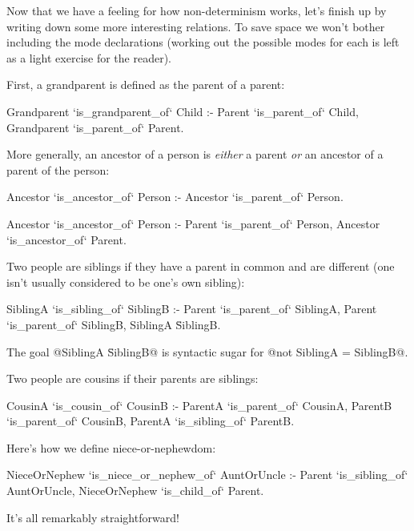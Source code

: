 Now that we have a feeling for how non-determinism works, let's finish up by
writing down some more interesting relations.  To save space we won't bother
including the mode declarations (working out the possible modes for each is
left as a light exercise for the reader).

First, a grandparent is defined as the parent of a parent:
\begin{myverbatim}
Grandparent `is_grandparent_of` Child :-
    Parent `is_parent_of` Child,
    Grandparent `is_parent_of` Parent.
\end{myverbatim}
More generally, an ancestor of a person is \emph{either} a parent 
\emph{or} an ancestor of a parent of the person:
\begin{myverbatim}
Ancestor `is_ancestor_of` Person :-
    Ancestor `is_parent_of` Person.

Ancestor `is_ancestor_of` Person :-
    Parent `is_parent_of` Person,
    Ancestor `is_ancestor_of` Parent.
\end{myverbatim}
Two people are siblings if they have a parent in common and are different
(one isn't usually considered to be one's own sibling):
\begin{myverbatim}
SiblingA `is_sibling_of` SiblingB :-
    Parent `is_parent_of` SiblingA,
    Parent `is_parent_of` SiblingB,
    SiblingA \= SiblingB.
\end{myverbatim}
The goal @SiblingA \= SiblingB@ is syntactic sugar for
@not SiblingA = SiblingB@.

Two people are cousins if their parents are siblings:
\begin{myverbatim}
CousinA `is_cousin_of` CousinB :-
    ParentA `is_parent_of` CousinA,
    ParentB `is_parent_of` CousinB,
    ParentA `is_sibling_of` ParentB.
\end{myverbatim}
Here's how we define niece-or-nephewdom:
\begin{myverbatim}
NieceOrNephew `is_niece_or_nephew_of` AuntOrUncle :-
    Parent `is_sibling_of` AuntOrUncle,
    NieceOrNephew `is_child_of` Parent.
\end{myverbatim}
It's all remarkably straightforward!



